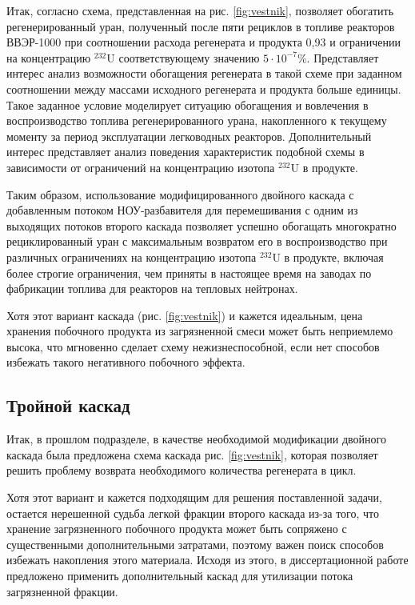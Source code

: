 Итак, согласно \cite{smirnovObogashchenieRegenerirovannogoUrana2018} схема, представленная на рис. \ref{fig:vestnik}, позволяет обогатить регенерированный уран, полученный после пяти рециклов в топливе реакторов ВВЭР-1000 при соотношении расхода регенерата и продукта 0,93 и ограничении на концентрацию $^{232}$U соответствующему значению $5\cdot10^{-7}$\%. Представляет интерес анализ возможности обогащения регенерата в такой схеме при заданном соотношении между массами исходного регенерата и продукта больше единицы. Такое заданное условие моделирует ситуацию обогащения и вовлечения в воспроизводство топлива регенерированного урана, накопленного к текущему моменту за период эксплуатации легководных реакторов. Дополнительный интерес представляет анализ поведения характеристик подобной схемы в зависимости от ограничений на концентрацию изотопа $^{232}$U в продукте. 





Таким образом, использование модифицированного двойного каскада с добавленным потоком НОУ-разбавителя для перемешивания с одним из выходящих потоков второго каскада позволяет успешно обогащать многократно рециклированный уран с максимальным возвратом его в воспроизводство при различных ограничениях на концентрацию изотопа $^{232}$U в продукте, включая более строгие ограничения, чем приняты в настоящее время на заводах по фабрикации топлива для реакторов на тепловых нейтронах.

Хотя этот вариант каскада (рис. \ref{fig:vestnik}) и кажется идеальным, цена хранения побочного продукта из загрязненной смеси может быть неприемлемо высока, что мгновенно сделает схему нежизнеспособной, если нет способов избежать такого негативного побочного эффекта.

\subsection{Тройной каскад}
Итак, в прошлом подразделе, в качестве необходимой модификации двойного каскада была предложена схема каскада рис. \ref{fig:vestnik}, которая позволяет решить проблему возврата необходимого количества регенерата в цикл.

Хотя этот вариант и кажется подходящим для решения поставленной задачи, остается нерешенной судьба легкой фракции второго каскада из-за того, что хранение загрязненного побочного продукта может быть сопряжено с существенными дополнительными затратами, поэтому важен поиск способов избежать накопления этого материала.
Исходя из этого, в диссертационной работе предложено применить дополнительный каскад для утилизации потока загрязненной фракции.

